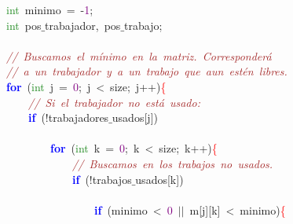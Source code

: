 \mbox{}\ \ \ \ \ \ \ \ \textcolor{ForestGreen}{int}\ minimo\ \textcolor{BrickRed}{=}\ \textcolor{BrickRed}{-}\textcolor{Purple}{1}\textcolor{BrickRed}{;} \\
\mbox{}\ \ \ \ \ \ \ \ \textcolor{ForestGreen}{int}\ pos$\_$trabajador\textcolor{BrickRed}{,}\ pos$\_$trabajo\textcolor{BrickRed}{;}\  \\
\mbox{} \\
\mbox{}\ \ \ \ \ \ \ \ \textit{\textcolor{Brown}{//\ Buscamos\ el\ mínimo\ en\ la\ matriz.\ Corresponderá}} \\
\mbox{}\ \ \ \ \ \ \ \ \textit{\textcolor{Brown}{//\ a\ un\ trabajador\ y\ a\ un\ trabajo\ que\ aun\ estén\ libres.\ }} \\
\mbox{}\ \ \ \ \ \ \ \ \textbf{\textcolor{Blue}{for}}\ \textcolor{BrickRed}{(}\textcolor{ForestGreen}{int}\ j\ \textcolor{BrickRed}{=}\ \textcolor{Purple}{0}\textcolor{BrickRed}{;}\ j\ \textcolor{BrickRed}{\textless{}}\ size\textcolor{BrickRed}{;}\ j\textcolor{BrickRed}{++)}\textcolor{Red}{\{} \\
\mbox{}\ \ \ \ \ \ \ \ \ \ \ \ \textit{\textcolor{Brown}{//\ Si\ el\ trabajador\ no\ está\ usado:\ }} \\
\mbox{}\ \ \ \ \ \ \ \ \ \ \ \ \textbf{\textcolor{Blue}{if}}\ \textcolor{BrickRed}{(!}trabajadores$\_$usados\textcolor{BrickRed}{[}j\textcolor{BrickRed}{])} \\
\mbox{} \\
\mbox{}\ \ \ \ \ \ \ \ \ \ \ \ \ \ \ \ \textbf{\textcolor{Blue}{for}}\ \textcolor{BrickRed}{(}\textcolor{ForestGreen}{int}\ k\ \textcolor{BrickRed}{=}\ \textcolor{Purple}{0}\textcolor{BrickRed}{;}\ k\ \textcolor{BrickRed}{\textless{}}\ size\textcolor{BrickRed}{;}\ k\textcolor{BrickRed}{++)}\textcolor{Red}{\{} \\
\mbox{}\ \ \ \ \ \ \ \ \ \ \ \ \ \ \ \ \ \ \ \ \textit{\textcolor{Brown}{//\ Buscamos\ en\ los\ trabajos\ no\ usados.\ }} \\
\mbox{}\ \ \ \ \ \ \ \ \ \ \ \ \ \ \ \ \ \ \ \ \textbf{\textcolor{Blue}{if}}\ \textcolor{BrickRed}{(!}trabajos$\_$usados\textcolor{BrickRed}{[}k\textcolor{BrickRed}{])} \\
\mbox{} \\
\mbox{}\ \ \ \ \ \ \ \ \ \ \ \ \ \ \ \ \ \ \ \ \ \ \ \ \textbf{\textcolor{Blue}{if}}\ \textcolor{BrickRed}{(}minimo\ \textcolor{BrickRed}{\textless{}}\ \textcolor{Purple}{0}\ \textcolor{BrickRed}{$|$$|$}\ m\textcolor{BrickRed}{[}j\textcolor{BrickRed}{][}k\textcolor{BrickRed}{]}\ \textcolor{BrickRed}{\textless{}}\ minimo\textcolor{BrickRed}{)}\textcolor{Red}{\{} \\
